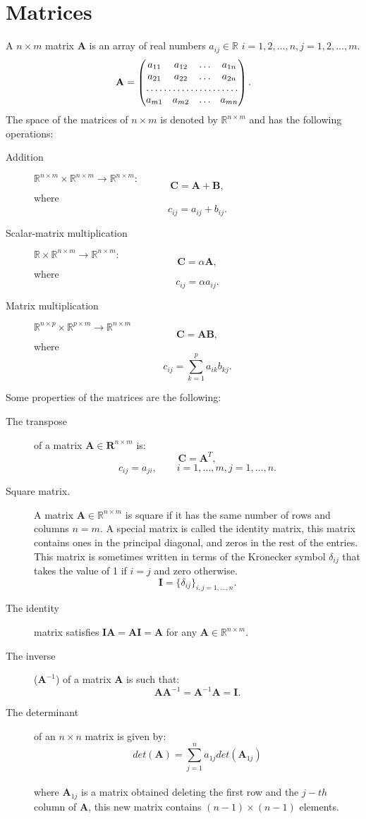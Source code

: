 \documentclass[12pt]{report}
\begin{document}
\section{Matrices}
A $n\times m$ matrix $\mathbf{A}$ is an array of real numbers $a_{ij} \in \mathbb{R}$  $i=1,2,\dots,n, j=1,2,\dots,m$.
\begin{equation*}
\mathbf{A}
=
\begin{pmatrix}
a_{11} & a_{12} & \dots & a_{1n}\\
a_{21} & a_{22} & \dots & a_{2n}\\
\hdotsfor{4}\\
a_{m1} & a_{m2} & \dots &a_{mn}
\end{pmatrix}
.
\end{equation*}
The space of the matrices of $n\times m$ is denoted by $\mathbb{R}^{n\times m}$ and has the following operations:
\begin{description}
 \item[Addition] $\mathbb{R}^{n\times m} \times \mathbb{R}^{n\times m} \xrightarrow{} \mathbb{R}^{n\times m}:$
$$\mathbf{C}=\mathbf{A}+\mathbf{B},$$ where $$c_{ij}=a_{ij}+b_{ij}.$$
\item [Scalar-matrix multiplication] $\mathbb{R} \times \mathbb{R}^{n\times m} \xrightarrow{} \mathbb{R}^{n\times m}:$
$$\mathbf{C}=\alpha \mathbf{A},$$ where $$c_{ij}=\alpha a_{ij}.$$
\item [Matrix multiplication] $\mathbb{R}^{n\times p} \times \mathbb{R}^{p\times m} \xrightarrow{} \mathbb{R}^{n\times m}$
$$\mathbf{C}=\mathbf{A}\mathbf{B},$$ where $$c_{ij}=\sum_{k=1}^p a_{ik}b_{kj}.$$
\end{description}
Some properties of the matrices are the following:
\begin{description}
 \item [The transpose] of a matrix $\mathbf{A} \in \mathbf{R}^{n\times m}$ is:
$$\mathbf{C}=\mathbf{A}^T,$$
$$c_{ij}=a_{ji}, \qquad i=1,\dots,m, j=1,\dots,n.$$
\item[Square matrix.] A matrix $\mathbf{A}\in \mathbb{R}^{n\times m}$ is square if it has the same number of rows and columns $n=m.$
A special matrix is called the identity matrix, this matrix contains ones in the principal diagonal, and zeros in the rest of the entries.
This matrix is sometimes written in terms of the Kronecker symbol $\delta_{ij}$ that takes the value of 1 if $i=j$ and zero otherwise.
$$\mathbf{I}=\{\delta_{ij}\}_{i,j=1,\dots ,n}.$$
\item[The identity] matrix satisfies $\mathbf{I}\mathbf{A}=\mathbf{A}\mathbf{I}=\mathbf{A}$ for any $\mathbf{A}\in \mathbb{R}^{n\times m}$.
\item[The inverse] ($\mathbf{A}^{-1}$) of a matrix $\mathbf{A}$ is such that: $$\mathbf{A}\mathbf{A}^{-1}=\mathbf{A}^{-1}\mathbf{A}=\mathbf{I}.$$
\item[The determinant] of an $n\times n$ matrix is given by:
$$det(\mathbf{A})=\sum_{j=1}^n a_{1j}det(\mathbf{A}_{1j})$$\\
where $\mathbf{A}_{1j}$ is a matrix obtained deleting the first row and the $j-th$ column of $\mathbf{A}$, this new matrix
contains $(n-1)\times (n-1)$ elements.
\end{description}
\end{document}
